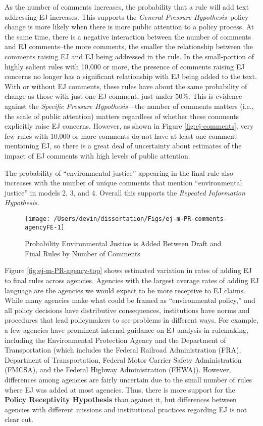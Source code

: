 \documentclass[
      12pt,
        ]{article}
\begin{document}
As the number of comments increases, the probability that a rule will add text addressing EJ increases. This supports the \emph{General Pressure Hypothesis}--policy change is more likely when there is more public attention to a policy process. At the same time, there is a negative interaction between the number of comments and EJ comments--the more comments, the smaller the relationship between the comments raising EJ and EJ being addressed in the rule. In the small-portion of highly salient rules with 10,000 or more, the presence of comments raising EJ concerns no longer has a significant relationship with EJ being added to the text. With or without EJ comments, these rules have about the same probability of change as those with just one EJ comment, just under 50\%. This is evidence against the \emph{Specific Pressure Hypothesis}---the number of comments matters (i.e., the scale of public attention) matters regardless of whether these comments explicitly raise EJ concerns. However, as shown in Figure \ref{fig:ej-comments}, very few rules with 10,000 or more comments do not have at least one comment mentioning EJ, so there is a great deal of uncertainty about estimates of the impact of EJ comments with high levels of public attention.

The probability of
``environmental justice'' appearing in the final rule also increases with the number of unique comments that mention ``environmental justice'' in models 2, 3, and 4. Overall this supports the \emph{Repeated Information Hypothesis}.

\begin{figure}

{\centering \texttt{[image: /Users/devin/dissertation/Figs/ej-m-PR-comments-agencyFE-1]} 

}

\caption{Probability Environmental Justice is Added Between Draft and Final Rules by Number of Comments}\label{fig:ej-m-PR-comments-agencyFE}
\end{figure}

Figure \ref{fig:ej-m-PR-agency-top} shows estimated variation in rates of adding EJ to final rules across agencies.
Agencies with the largest average rates of adding EJ language are the agencies we would expect to be more receptive to EJ claims. While many agencies make what could be framed as ``environmental policy,'' and all policy decisions have distributive consequences, institutions have norms and procedures that lead policymakers to see problems in different ways. For example, a few agencies have prominent internal guidance on EJ analysis in rulemaking, including the Environmental Protection Agency and the Department of Transportation (which includes the Federal Railroad Administration (FRA), Department of Transportation, Federal Motor Carrier Safety Administration (FMCSA), and the Federal Highway Administration (FHWA)). However, differences among agencies are fairly uncertain due to the small number of rules where EJ was added at most agencies. Thus, there is more support for the \textbf{Policy Receptivity Hypothesis} than against it, but differences between agencies with different missions and institutional practices regarding EJ is not clear cut.
\end{document}
